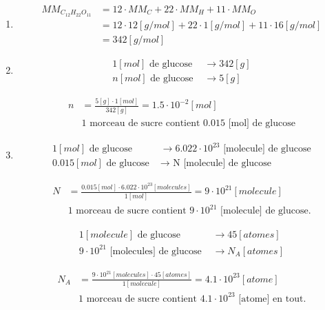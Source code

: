 \documentclass[
  11pt,
  a4paper,
  openany]{book}
\begin{document}
\begin{Answer}

\begin{enumerate}
\def\labelenumi{\arabic{enumi}.}
\item
  \[ \begin{split}
    MM_{C_{12}H_{22}O_{11}} &= 12 \cdot MM_C + 22 \cdot MM_H + 11 \cdot MM_O \\
    &= 12 \cdot 12 [g/mol] + 22 \cdot 1 [g/mol] + 11 \cdot 16 [g/mol] \\
    &= 342 [g/mol]
    \end{split} \]
\item
  \[  \begin{split}
   1 [mol] \text{ de glucose } & \longrightarrow 342 [g]\\
   n [mol] \text{ de glucose } & \longrightarrow 5 [g]
  \end{split} \]

  \[  \begin{split}
   n &= \frac{5[g] \cdot 1[mol]}{342[g]} = 1.5 \cdot 10^{-2} [mol] \\
   & \text{1 morceau de sucre contient 0.015 [mol] de glucose}
   \end{split} \]
\item
  \[  \begin{split}
   1 [mol] \text{ de glucose } & \longrightarrow 6.022 \cdot 10^{23} \text{ [molecule] de glucose} \\
   0.015 [mol] \text{ de glucose } & \longrightarrow \text{ N [molecule] de glucose}
   \end{split} \]

  \[  \begin{split}
  N &= \frac{0.015 [mol] \cdot 6.022\cdot 10^{23} [molecules]}{1 [mol]} = 9\cdot 10^{21} [molecule]\\
  & \text{1 morceau de sucre contient } 9\cdot 10^{21} \text{ [molecule] de glucose.}
  \end{split} \]

  \[  \begin{split}
   1 [molecule] \text{ de glucose } & \longrightarrow 45 [atomes] \\
   9\cdot 10^{21} \text{ [molecules] de glucose } & \longrightarrow N_A [atomes]
   \end{split} \]

  \[  \begin{split}
   N_A &= \frac{9 \cdot 10^{21} [molecules] \cdot 45 [atomes]}{1 [molecule]} = 4.1 \cdot 10^{23} [atome] \\
   & \text{1 morceau de sucre contient } 4.1 \cdot 10^{23} \text{ [atome] en tout.}
   \end{split} \]
\end{enumerate}

\end{Answer}
\end{document}
